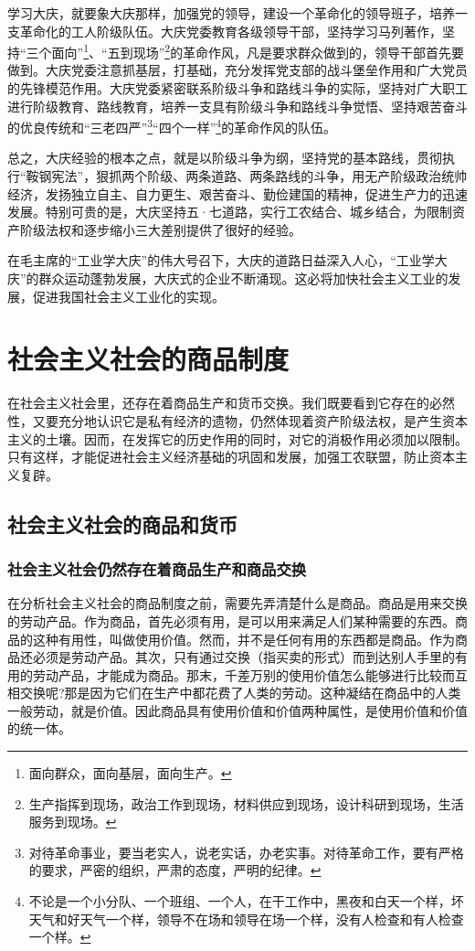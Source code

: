 \documentclass{book}
\begin{document}
学习大庆，就要象大庆那样，加强党的领导，建设一个革命化的领导班子，培养一支革命化的工人阶级队伍。大庆党委教育各级领导干部，坚持学习马列著作，坚持“三个面向”\footnote{面向群众，面向基层，面向生产。}、“五到现场”\footnote{生产指挥到现场，政治工作到现场，材料供应到现场，设计科研到现场，生活服务到现场。}的革命作风，凡是要求群众做到的，领导干部首先要做到。大庆党委注意抓基层，打基础，充分发挥党支部的战斗堡垒作用和广大党员的先锋模范作用。大庆党委紧密联系阶级斗争和路线斗争的实际，坚持对广大职工进行阶级教育、路线教育，培养一支具有阶级斗争和路线斗争觉悟、坚持艰苦奋斗的优良传统和“三老四严”\footnote{对待革命事业，要当老实人，说老实话，办老实事。对待革命工作，要有严格的要求，严密的组织，严肃的态度，严明的纪律。}“四个一样”\footnote{不论是一个小分队、一个班组、一个人，在干工作中，黑夜和白天一个样，坏天气和好天气一个样，领导不在场和领导在场一个样，没有人检查和有人检查一个样。}的革命作风的队伍。

总之，大庆经验的根本之点，就是以阶级斗争为纲，坚持党的基本路线，贯彻执行“鞍钢宪法”，狠抓两个阶级、两条道路、两条路线的斗争，用无产阶级政治统帅经济，发扬独立自主、自力更生、艰苦奋斗、勤俭建国的精神，促进生产力的迅速发展。特别可贵的是，大庆坚持五·七道路，实行工农结合、城乡结合，为限制资产阶级法权和逐步缩小三大差别提供了很好的经验。

在毛主席的“工业学大庆”的伟大号召下，大庆的道路日益深入人心，“工业学大庆”的群众运动蓬勃发展，大庆式的企业不断涌现。这必将加快社会主义工业的发展，促进我国社会主义工业化的实现。

\chapter{社会主义社会的商品制度}

在社会主义社会里，还存在着商品生产和货币交换。我们既要看到它存在的必然性，又要充分地认识它是私有经济的遗物，仍然体现着资产阶级法权，是产生资本主义的土壤。因而，在发挥它的历史作用的同时，对它的消极作用必须加以限制。只有这样，才能促进社会主义经济基础的巩固和发展，加强工农联盟，防止资本主义复辟。

\section{社会主义社会的商品和货币}

\subsection{社会主义社会仍然存在着商品生产和商品交换}

在分析社会主义社会的商品制度之前，需要先弄清楚什么是商品。商品是用来交换的劳动产品。作为商品，首先必须有用，是可以用来满足人们某种需要的东西。商品的这种有用性，叫做使用价值。然而，并不是任何有用的东西都是商品。作为商品还必须是劳动产品。其次，只有通过交换（指买卖的形式）而到达别人手里的有用的劳动产品，才能成为商品。那末，千差万别的使用价值怎么能够进行比较而互相交换呢?那是因为它们在生产中都花费了人类的劳动。这种凝结在商品中的人类一般劳动，就是价值。因此商品具有使用价值和价值两种属性，是使用价值和价值的统一体。
\end{document}
